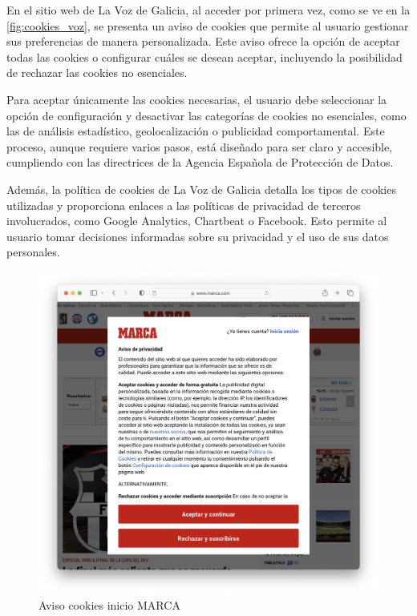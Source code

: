 En el sitio web de La Voz de Galicia, al acceder por primera vez, como se ve en la \ref{fig:cookies_voz}, se presenta un aviso de cookies que permite al usuario gestionar sus preferencias de manera personalizada. Este aviso ofrece la opción de aceptar todas las cookies o configurar cuáles se desean aceptar, incluyendo la posibilidad de rechazar las cookies no esenciales. 

Para aceptar únicamente las cookies necesarias, el usuario debe seleccionar la opción de configuración y desactivar las categorías de cookies no esenciales, como las de análisis estadístico, geolocalización o publicidad comportamental. Este proceso, aunque requiere varios pasos, está diseñado para ser claro y accesible, cumpliendo con las directrices de la Agencia Española de Protección de Datos. 

Además, la política de cookies de La Voz de Galicia detalla los tipos de cookies utilizadas y proporciona enlaces a las políticas de privacidad de terceros involucrados, como Google Analytics, Chartbeat o Facebook. Esto permite al usuario tomar decisiones informadas sobre su privacidad y el uso de sus datos personales. 

\begin{figure}[H]   
    \includegraphics[width=15cm]{cookies_marca.png}
    \caption{Aviso cookies inicio MARCA}
    \label{fig:cookies_marca}
\end{figure}

